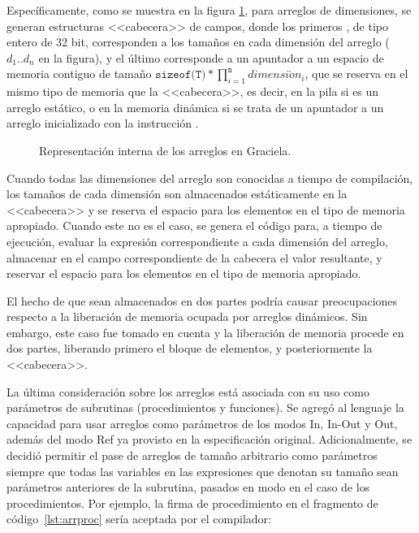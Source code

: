 Específicamente, como se muestra en la figura \ref{fig:diag}, para arreglos de  dimensiones, se generan estructuras
<<cabecera>> de  campos, donde los primeros , de tipo entero
de 32 bit, corresponden a los tamaños en cada dimensión del arreglo ($d_1..d_n$ en la figura), y el último
corresponde a un apuntador a un espacio de memoria contiguo de tamaño
$\texttt{sizeof(T)} * \prod\limits_{i=1}^\texttt{n} dimensi\acute{o}n_i$, que se
reserva en el mismo tipo de memoria que la <<cabecera>>, es decir, en la pila si
es un arreglo estático, o en la memoria dinámica si se trata de un apuntador a
un arreglo inicializado con la instrucción .

\begin{figure}[h!]
  \hspace{8mm}
  \caption{Representación interna de los arreglos en Graciela.}
  \centering
    \fboxsep=5mm
    \fboxrule=0.75pt
    \label{fig:diag}
\end{figure}

Cuando todas las dimensiones del arreglo son conocidas a tiempo de compilación,
los tamaños de cada dimensión son almacenados estáticamente en la <<cabecera>> y
se reserva el espacio para los elementos en el tipo de memoria apropiado. Cuando
este no es el caso, se genera el código para, a tiempo de ejecución, evaluar la
expresión correspondiente a cada dimensión del arreglo, almacenar en el campo
correspondiente de la cabecera el valor resultante, y reservar el espacio para
los elementos en el tipo de memoria apropiado.

El hecho de que sean almacenados en dos partes podría causar preocupaciones
respecto a la liberación de memoria ocupada por arreglos dinámicos. Sin embargo,
este caso fue tomado en cuenta y la liberación de memoria procede en dos partes,
liberando primero el bloque de elementos, y posteriormente la <<cabecera>>.

La última consideración sobre los arreglos está asociada con su uso como
parámetros de subrutinas (procedimientos y funciones). Se agregó al lenguaje la
capacidad para usar arreglos como parámetros de los modos In, In-Out y Out,
además del modo Ref ya provisto en la especificación original. Adicionalmente,
se decidió permitir el pase de arreglos de tamaño arbitrario como parámetros
siempre que todas las variables en las expresiones que denotan su tamaño sean
parámetros anteriores de la subrutina, pasados en modo  en el caso
de los procedimientos. Por ejemplo, la firma de procedimiento en el fragmento de código~\ref{lst:arrproc} sería
aceptada por el compilador:

